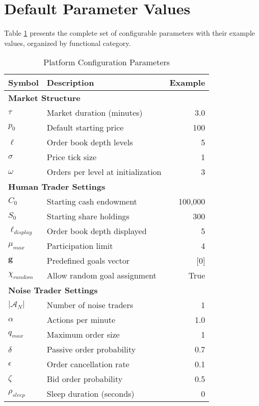 \appendix

\section{Default Parameter Values}
\label{app:parameters}

Table \ref{tab:parameters} presents the complete set of configurable parameters with their example values, organized by functional category.

\begin{table}[h]
\centering
\caption{Platform Configuration Parameters}
\label{tab:parameters}
\begin{tabular}{p{}p{}r}
\toprule
Symbol & Description & Example \\
\midrule
\multicolumn{3}{l}{\textbf{Market Structure}} \\
$\tau$ & Market duration (minutes) & 3.0 \\
$p_0$ & Default starting price & 100 \\
$\ell$ & Order book depth levels & 5 \\
$\sigma$ & Price tick size & 1 \\
$\omega$ & Orders per level at initialization & 3 \\
\midrule
\multicolumn{3}{l}{\textbf{Human Trader Settings}} \\
$C_0$ & Starting cash endowment & 100,000 \\
$S_0$ & Starting share holdings & 300 \\
$\ell_{display}$ & Order book depth displayed & 5 \\
$\mu_{max}$ & Participation limit & 4 \\
$\mathbf{g}$ & Predefined goals vector & [0] \\
$\chi_{random}$ & Allow random goal assignment & True \\
\midrule
\multicolumn{3}{l}{\textbf{Noise Trader Settings}} \\
$|\mathcal{A}_N|$ & Number of noise traders & 1 \\
$\alpha$ & Actions per minute & 1.0 \\
$q_{max}$ & Maximum order size & 1 \\
$\delta$ & Passive order probability & 0.7 \\
$\epsilon$ & Order cancellation rate & 0.1 \\
$\zeta$ & Bid order probability & 0.5 \\
$\rho_{sleep}$ & Sleep duration (seconds) & 0 \\

\end{tabular}
\end{table}
